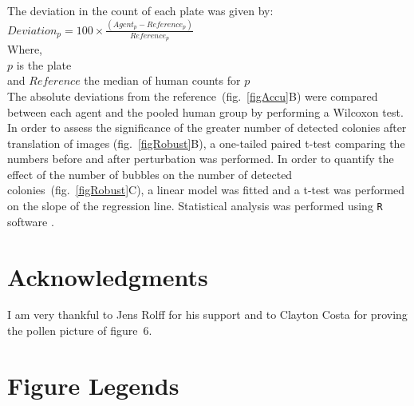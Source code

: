 \documentclass[10pt]{article}
\begin{document}
The deviation in the count of each plate was given by:\\
\newline{}
$Deviation_p =100\times{}\frac{ (Agent_p-Reference_p)}{Reference_p}$\\
\newline{}
Where,\\
$p$ is the plate\\
and $Reference$ the median of human counts for $p$\\

The absolute deviations from the reference~(fig.~\ref{figAccu}B) were compared
between each agent and the pooled human group by performing a Wilcoxon test.
In order to assess the significance of the greater number of detected colonies
after translation of images (fig.~\ref{figRobust}B), a one-tailed paired t-test
comparing the numbers before and after perturbation was performed.
In order to quantify the effect of the number of bubbles on the number of
detected colonies~(fig.~\ref{figRobust}C), a linear model was fitted and a t-test
was performed on the slope of the regression line.
Statistical analysis was performed using \texttt{R} software\cite{R} .
 
\section*{Acknowledgments}
I am very thankful to Jens Rolff for his support and to Clayton
Costa for proving the pollen picture of 
figure~6.


\newpage{}

\section*{Figure Legends} 
\end{document}
